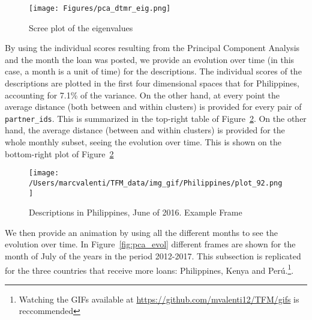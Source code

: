 \begin{figure}[H]
\texttt{[image: Figures/pca\_dtmr\_eig.png]}
\caption{Scree plot of the eigenvalues}
\label{fig:eig_pca}
\end{figure}


By using the individual scores resulting from the Principal Component Analysis and the month the loan was posted, we provide an evolution over time (in this case, a month is a unit of time) for the descriptions.
The individual scores of the descriptions are plotted in the first four dimensional spaces that for Philippines, accounting for 7.1\% of the variance.
On the other hand, at every point the average distance (both between and within clusters) is provided for every pair of \texttt{partner\_ids}. This is summarized in the top-right table of Figure~\ref{Fig:phili_pca_example}. On the other hand, the average distance (between and within clusters) is provided for the whole monthly subset, seeing the evolution over time. This is shown on the bottom-right plot of Figure~\ref{Fig:phili_pca_example} \par

\begin{figure}[h] 
    \centering
    \texttt{[image: /Users/marcvalenti/TFM\_data/img\_gif/Philippines/plot\_92.png]} 
  \caption{Descriptions in Philippines, June of 2016. Example Frame}
  \label{Fig:phili_pca_example}
\end{figure}


We then provide an animation by using all the different months to see the evolution over time. In Figure~\ref{fig:pca_evol} different frames are shown for the month of July of the years in the period 2012-2017.
This subsection is replicated for the three countries that receive more loans: Philippines, Kenya and Perú.\footnote{Watching the GIFs available at \url{https://github.com/mvalenti12/TFM/gifs} is reccommended}.


